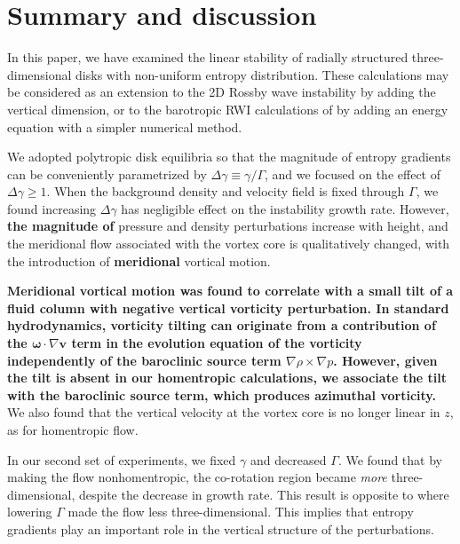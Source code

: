 \section{Summary and discussion}\label{summary}
In this paper, we have examined the linear stability of radially
structured three-dimensional disks with non-uniform entropy
distribution. These calculations may be considered as an extension to 
the 2D Rossby wave instability \citep{li00} by adding the vertical
dimension, or to the barotropic RWI calculations of  by
adding an energy equation with a simpler numerical method. 

We adopted polytropic disk equilibria so that
the magnitude of entropy gradients can be conveniently parametrized
by $\Delta\gamma\equiv\gamma/\Gamma$, and we focused on the effect of
$\Delta\gamma\geq1$. When the background density and
velocity field is fixed through $\Gamma$, we found increasing $\Delta
\gamma$ has negligible effect on the instability growth rate. However,
{\bf the magnitude of} pressure and density perturbations increase with height, and the 
meridional flow associated with the vortex core is qualitatively
changed, with the introduction of {\bf meridional} vortical
motion. 

{\bf Meridional vortical motion was found to correlate with a small 
  tilt of a fluid column with negative vertical vorticity
  perturbation.  In standard hydrodynamics, vorticity tilting
  can originate from a contribution of the
  $\bm{\omega}\cdot\nabla\bm{v}$ term in the evolution equation of the
  vorticity independently of the baroclinic source term $\nabla \rho
  \times\nabla p$. However, given the tilt is absent in our homentropic
  calculations, we associate the tilt with the baroclinic source term, which
  produces azimuthal vorticity. } 
We also found
that the vertical velocity at the vortex core is no longer linear in
$z$, as for homentropic flow. 

In our second set of experiments, we fixed $\gamma$ and decreased
$\Gamma$. We found that by making the flow nonhomentropic, the
co-rotation region became \emph{more} three-dimensional, despite the
decrease in growth rate. This result
is opposite to  where lowering $\Gamma$ made the
flow less three-dimensional. This implies that entropy gradients  
play an important role in the vertical structure of the perturbations. 

